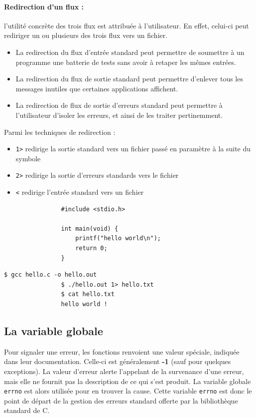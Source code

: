 			\paragraph{Redirection d'un flux :} l'utilité concrète des trois flux est attribuée à l'utilisateur. En effet, celui-ci peut rediriger un ou plusieurs des trois flux vers un fichier. 
			\begin{itemize}
				\item La redirection du flux d'entrée standard peut permettre de soumettre à un programme une batterie de tests sans avoir à retaper les mêmes entrées. 
				\item La redirection du flux de sortie standard peut permettre d'enlever tous les messages inutiles que certaines applications affichent.
				\item La redirection de flux de sortie d'erreurs standard peut permettre à l'utilisateur d'isoler les erreurs, et ainsi de les traiter pertinemment.
			\end{itemize}	
			Parmi les techniques de redirection :
			\begin{itemize}
				\item \lstinline!1>! redirige la sortie standard vers un fichier passé en paramètre à la suite du symbole 
				\item \lstinline!2>! redirige la sortie d'erreurs standards vers le fichier
				\item \lstinline!<! redirige l'entrée standard vers un fichier
			\end{itemize}
			
			\begin{lstlisting}
				#include <stdio.h>
				
				int main(void) {
					printf("hello world\n");
					return 0;
				}
			\end{lstlisting}
			
			\begin{lstlisting}[style=terminal]
				$ gcc hello.c -o hello.out
				$ ./hello.out 1> hello.txt
				$ cat hello.txt
				hello world !
			\end{lstlisting}
			
			
	\subsection{La variable globale }
	
		Pour signaler une erreur, les fonctions renvoient une valeur spéciale, indiquée dans leur documentation. Celle-ci est généralement \textbf{-1} (sauf pour quelques exceptions). La valeur d'erreur alerte l'appelant de la survenance d'une erreur, mais elle ne fournit pas la description de ce qui s'est produit. La variable globale \lstinline!errno! est alors utilisée pour en trouver la cause. Cette variable \lstinline!errno! est donc le point de départ de la gestion des erreurs standard offerte par la bibliothèque standard de C. 
		
